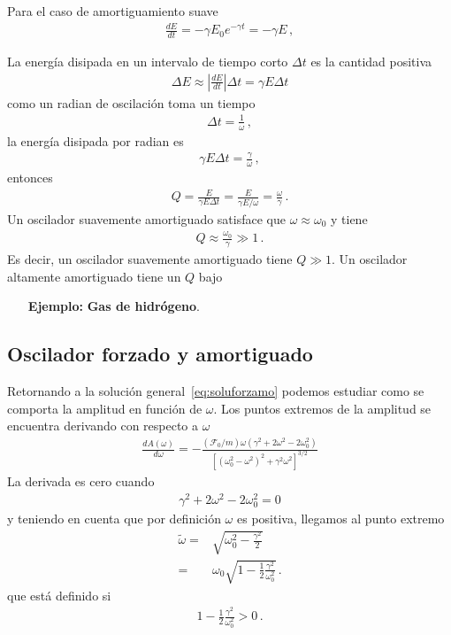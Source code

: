 Para el caso de amortiguamiento suave
\begin{align*}
  \frac{dE}{dt}=-\gamma E_0 e^{-\gamma t}=-\gamma E\,,
\end{align*}

La energía disipada en un intervalo de tiempo corto $\Delta t$ es la cantidad positiva
\begin{align*}
  \Delta E\approx\left|\frac{d E}{d t}\right|\Delta t=\gamma E \Delta t
\end{align*}
como un radian de oscilación toma un tiempo
\begin{align*}
  \Delta t=\frac{1}{\omega}\,,
\end{align*}
la energía disipada por radian es
\begin{align*}
  \gamma E \Delta t=\frac{\gamma}{\omega}\,,
\end{align*}
entonces
\begin{align}
  \label{eq:calidad}
  Q=\frac{E}{\gamma E \Delta t}=\frac{E}{\gamma E/\omega}=\frac{\omega}{\gamma}\,.
\end{align}
Un oscilador suavemente amortiguado satisface que $\omega\approx\omega_0$ y tiene
\begin{align*}
 Q \approx \frac{\omega_0}{\gamma}\gg 1\,.
\end{align*}
Es decir, un oscilador suavemente amortiguado tiene $Q\gg 1$. Un oscilador altamente amortiguado tiene un $Q$ bajo

\begin{itemize}
\item[\textbf{Ejemplo:}] \textbf{Gas de hidrógeno}. 
\end{itemize}

\subsection{Oscilador forzado y amortiguado}
Retornando a la solución general~\eqref{eq:soluforzamo} podemos estudiar como se comporta la amplitud en función de $\omega$. Los puntos extremos de la amplitud se encuentra derivando con respecto a $\omega$
\begin{align*}
\frac{d A(\omega)}{d\omega}=
  -\frac{(\mathcal{F}_0/m) \omega  \left(\gamma^2+2 \omega^2-2 \omega_0^2\right)}{
  \left[\left(\omega_0^2-\omega^2\right)^2+\gamma^2\omega^2\right]^{3/2}}
\end{align*}
La derivada es cero cuando
\begin{align*}
  \gamma^2+2 \omega^2-2 \omega_0^2=0
\end{align*}
y teniendo en cuenta que por definición $\omega$ es positiva, llegamos al punto extremo
\begin{align*}
  \tilde\omega=&\sqrt{\omega _0^2-\frac{\gamma^2}{2}}\nonumber\\
=&\omega_0\sqrt{1-\frac{1}{2}\frac{\gamma^2}{\omega_0^2}}\,.
\end{align*}
que está definido si
\begin{align}
  \label{eq:solcon}
  1-\frac{1}{2}\frac{\gamma^2}{\omega_0^2}>0\,.
\end{align}

